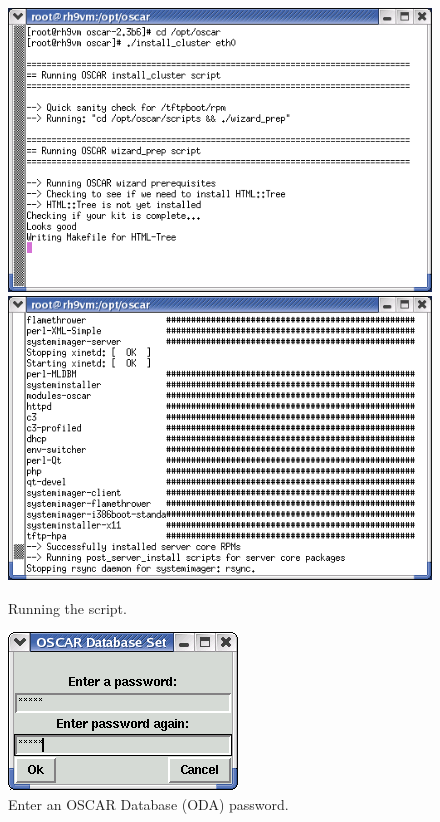 \begin{figure}[h!]
  \begin{center}
    \centerline{
      \includegraphics[scale=\imgscale]{figs/1a_sbs-install-oscar}
      \hspace{\imghskip}
      \includegraphics[scale=\imgscale]{figs/1b_sbs-install-oscar2}
      }
    \caption{Running the  script.}
    \label{fig:sbs-install-oscar}
  \end{center}
\end{figure}

\begin{figure}[h!]
  \begin{center}
    \centerline{\includegraphics[scale=\imgscale]{figs/sbs-oda-password}}
    \caption{Enter an OSCAR Database (ODA) password.}
    \label{fig:sbs-oda-password}
  \end{center}
\end{figure}

